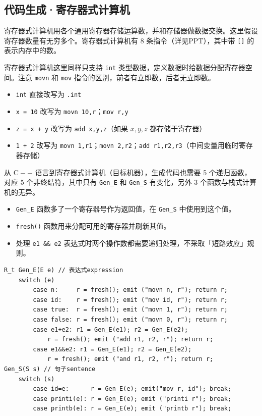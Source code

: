 \documentclass[UTF8]{ctexart}
\newcommand\Emph[1]{\textcolor{cyan!80!black}{#1}}
\begin{document}
\subsection{代码生成·寄存器式计算机}
\Emph{寄存器式计算机}用各个通用寄存器存储运算数，并和存储器做数据交换。这里假设寄存器数量有无穷多个。寄存器式计算机有 8 条指令（详见PPT），其中带 \verb![]! 的表示内存中的数。

寄存器式计算机这里同样只支持 \verb!int! 类型数据，定义数据时给数据分配\Emph{寄存器}空间。注意 \verb!movn! 和 \verb!mov! 指令的区别，前者有立即数，后者无立即数。
\begin{itemize}[itemsep=0pt,parsep=0pt,leftmargin=1.5cm]
  \item \verb!int! 直接改写为 \verb!.int!
  \item \verb!x = 10! 改写为 \verb!movn 10,r!；\verb!mov r,y!
  \item \verb!z = x + y! 改写为 \verb!add x,y,z!（如果 $x,y,z$ 都存储于寄存器）
  \item \verb!1 + 2! 改写为 \verb!movn 1,r1!；\verb!movn 2,r2!；\verb!add r1,r2,r3!（中间变量用临时寄存器存储）
\end{itemize}

从 $\mathrm{C--}$ 语言到寄存器式计算机（目标机器），生成代码也需要 5 个递归函数，对应 5 个非终结符，其中只有 \verb!Gen_E! 和 \verb!Gen_S! 有变化，另外 3 个函数与栈式计算机的无异。
\begin{itemize}[itemsep=0pt,parsep=0pt,leftmargin=1.5cm]
  \item \verb!Gen_E! 函数多了一个寄存器号作为返回值，在 \verb!Gen_S! 中使用到这个值。
  \item \verb!fresh()! 函数用来分配可用的寄存器并刷新其值。
  \item 处理 \verb!e1 && e2! 表达式时两个操作数都需要递归处理，不采取「短路效应」规则。
\end{itemize}
\begin{lstlisting}
R_t Gen_E(E e) // 表达式expression
    switch (e)
        case n:     r = fresh(); emit ("movn n, r"); return r;
        case id:    r = fresh(); emit ("mov id, r"); return r;
        case true:  r = fresh(); emit ("movn 1, r"); return r;
        case false: r = fresh(); emit ("movn 0, r"); return r;
        case e1+e2: r1 = Gen_E(e1); r2 = Gen_E(e2);
            r = fresh(); emit ("add r1, r2, r"); return r;
        case e1&&e2: r1 = Gen_E(e1); r2 = Gen_E(e2);
            r = fresh(); emit ("and r1, r2, r"); return r;
Gen_S(S s) // 句子sentence
    switch (s)
        case id=e:      r = Gen_E(e); emit("mov r, id"); break;
        case printi(e): r = Gen_E(e); emit ("printi r"); break;
        case printb(e): r = Gen_E(e); emit ("printb r"); break;
\end{lstlisting}
\end{document}
